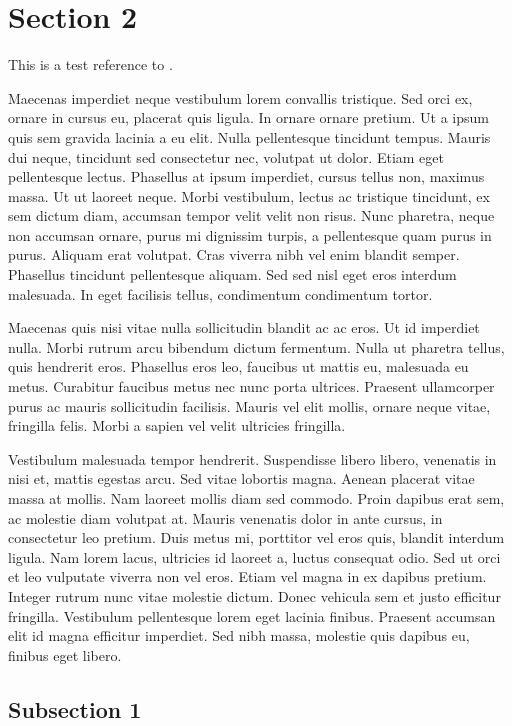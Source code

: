 \section{Section 2}

This is a test reference to \autocite{king_anthony_2022}.


Maecenas imperdiet neque vestibulum lorem convallis tristique. Sed orci ex, ornare in cursus eu, placerat quis ligula. In ornare ornare pretium. Ut a ipsum quis sem gravida lacinia a eu elit. Nulla pellentesque tincidunt tempus. Mauris dui neque, tincidunt sed consectetur nec, volutpat ut dolor. Etiam eget pellentesque lectus. Phasellus at ipsum imperdiet, cursus tellus non, maximus massa. Ut ut laoreet neque. Morbi vestibulum, lectus ac tristique tincidunt, ex sem dictum diam, accumsan tempor velit velit non risus. Nunc pharetra, neque non accumsan ornare, purus mi dignissim turpis, a pellentesque quam purus in purus. Aliquam erat volutpat. Cras viverra nibh vel enim blandit semper. Phasellus tincidunt pellentesque aliquam. Sed sed nisl eget eros interdum malesuada. In eget facilisis tellus, condimentum condimentum tortor.

Maecenas quis nisi vitae nulla sollicitudin blandit ac ac eros. Ut id imperdiet nulla. Morbi rutrum arcu bibendum dictum fermentum. Nulla ut pharetra tellus, quis hendrerit eros. Phasellus eros leo, faucibus ut mattis eu, malesuada eu metus. Curabitur faucibus metus nec nunc porta ultrices. Praesent ullamcorper purus ac mauris sollicitudin facilisis. Mauris vel elit mollis, ornare neque vitae, fringilla felis. Morbi a sapien vel velit ultricies fringilla.

Vestibulum malesuada tempor hendrerit. Suspendisse libero libero, venenatis in nisi et, mattis egestas arcu. Sed vitae lobortis magna. Aenean placerat vitae massa at mollis. Nam laoreet mollis diam sed commodo. Proin dapibus erat sem, ac molestie diam volutpat at. Mauris venenatis dolor in ante cursus, in consectetur leo pretium. Duis metus mi, porttitor vel eros quis, blandit interdum ligula. Nam lorem lacus, ultricies id laoreet a, luctus consequat odio. Sed ut orci et leo vulputate viverra non vel eros. Etiam vel magna in ex dapibus pretium. Integer rutrum nunc vitae molestie dictum. Donec vehicula sem et justo efficitur fringilla. Vestibulum pellentesque lorem eget lacinia finibus. Praesent accumsan elit id magna efficitur imperdiet. Sed nibh massa, molestie quis dapibus eu, finibus eget libero.

\subsection{Subsection 1}

